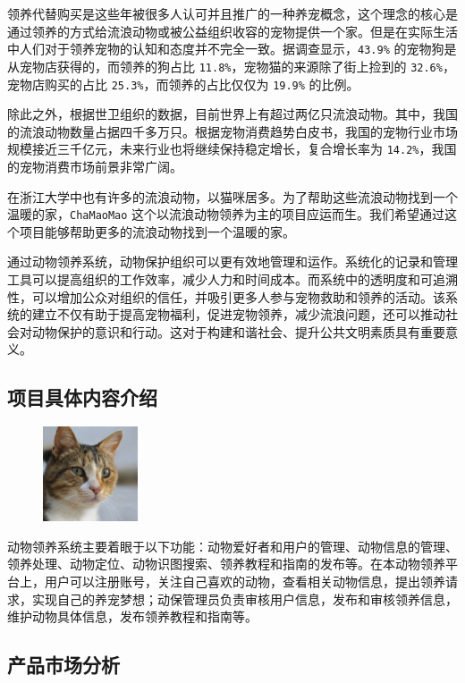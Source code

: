 \documentclass[12pt,a4paper,UTF8]{article}
\begin{document}
领养代替购买是这些年被很多人认可并且推广的一种养宠概念，这个理念的核心是通过领养的方式给流浪动物或被公益组织收容的宠物提供一个家。但是在实际生活中人们对于领养宠物的认知和态度并不完全一致。据调查显示，\verb|43.9%| 的宠物狗是从宠物店获得的，而领养的狗占比 \verb|11.8%|，宠物猫的来源除了街上捡到的 \verb|32.6%|，宠物店购买的占比 \verb|25.3%|，而领养的占比仅仅为 \verb|19.9%| 的比例。

除此之外，根据世卫组织的数据，目前世界上有超过两亿只流浪动物。其中，我国的流浪动物数量占据四千多万只。根据宠物消费趋势白皮书，我国的宠物行业市场规模接近三千亿元，未来行业也将继续保持稳定增长，复合增长率为 \verb|14.2%|，我国的宠物消费市场前景非常广阔。

在浙江大学中也有许多的流浪动物，以猫咪居多。为了帮助这些流浪动物找到一个温暖的家，\verb|ChaMaoMao| 这个以流浪动物领养为主的项目应运而生。我们希望通过这个项目能够帮助更多的流浪动物找到一个温暖的家。

通过动物领养系统，动物保护组织可以更有效地管理和运作。系统化的记录和管理工具可以提高组织的工作效率，减少人力和时间成本。而系统中的透明度和可追溯性，可以增加公众对组织的信任，并吸引更多人参与宠物救助和领养的活动。该系统的建立不仅有助于提高宠物福利，促进宠物领养，减少流浪问题，还可以推动社会对动物保护的意识和行动。这对于构建和谐社会、提升公共文明素质具有重要意义。

\subsection{项目具体内容介绍}

\begin{figure}[!htbp]
  \centering
  \includegraphics[width=0.25\textwidth]{figures/example.png}
\end{figure}

动物领养系统主要着眼于以下功能：动物爱好者和用户的管理、动物信息的管理、领养处理、动物定位、动物识图搜索、领养教程和指南的发布等。在本动物领养平台上，用户可以注册账号，关注自己喜欢的动物，查看相关动物信息，提出领养请求，实现自己的养宠梦想；动保管理员负责审核用户信息，发布和审核领养信息，维护动物具体信息，发布领养教程和指南等。

\subsection{产品市场分析}
\end{document}
